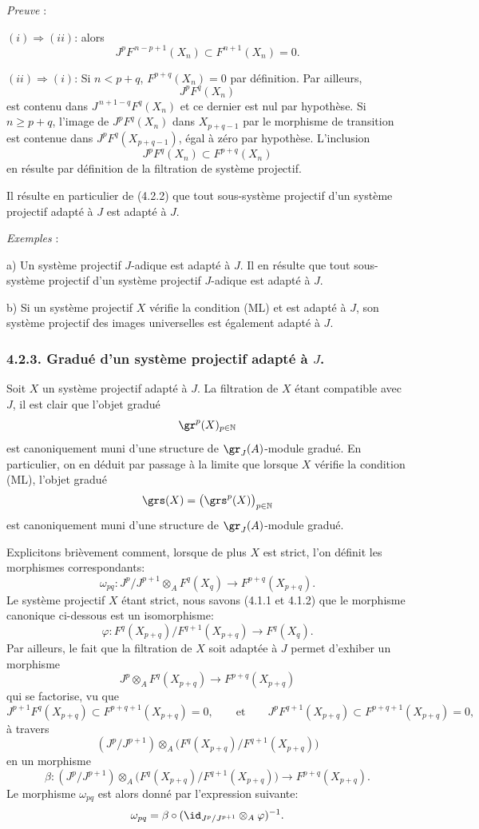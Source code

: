 \emph{Preuve} :

\((i)\Rightarrow(ii)\): alors
\[
J^pF^{\,n-p+1}(X_n)\subset F^{n+1}(X_n)=0.
\]

\((ii)\Rightarrow(i)\): Si \(n<p+q\), \(F^{p+q}(X_n)=0\) par définition. Par
ailleurs,
\[
J^pF^q(X_n)
\]
est contenu dans \(J^{\,n+1-q}F^q(X_n)\) et ce dernier est nul par hypothèse. Si \(n\ge p+q\), l'image de \(J^pF^q(X_n)\) dans \(X_{p+q-1}\) par le morphisme de transition est contenue dans \(J^pF^q(X_{p+q-1})\), égal à zéro par hypothèse. L'inclusion
\[
J^pF^q(X_n)\subset F^{p+q}(X_n)
\]
en résulte par définition de la filtration de système projectif.

Il résulte en particulier de (4.2.2) que tout sous-système projectif d'un système projectif adapté à \(J\) est adapté à \(J\).

\emph{Exemples} :

a) Un système projectif \(J\)-adique est adapté à \(J\). Il en résulte que tout sous-système projectif d'un système projectif \(J\)-adique est adapté à \(J\).

b) Si un système projectif \(X\) vérifie la condition (ML) et est adapté à \(J\), son système projectif des images universelles est également adapté à \(J\).

\subsubsection*{4.2.3. Gradué d'un système projectif adapté à \(J\).}
Soit \(X\) un système projectif adapté à \(J\). La filtration de \(X\) étant compatible avec \(J\), il est clair que l'objet gradué
\[
\gr^p(X)_{p\in\mathbb{N}}
\]
est canoniquement muni d'une structure de \(\gr_J(A)\)-module gradué. En particulier, on en déduit par passage à la limite que lorsque \(X\) vérifie la condition (ML), l'objet gradué
\[
\grs(X)=\bigl(\grs^p(X)\bigr)_{p\in\mathbb{N}}
\]
est canoniquement muni d'une structure de \(\gr_J(A)\)-module gradué.

Explicitons brièvement comment, lorsque de plus \(X\) est strict, l'on définit les morphismes correspondants:
\[
\omega_{pq}: J^p/J^{p+1}\otimes_A F^q(X_q)\longrightarrow F^{p+q}(X_{p+q}).
\]
Le
système projectif \(X\) étant strict, nous savons (4.1.1 et 4.1.2) que le morphisme canonique ci-dessous est un isomorphisme:
\[
\varphi:F^q(X_{p+q})/F^{q+1}(X_{p+q})\longrightarrow F^q(X_q).
\]
Par ailleurs, le fait que la filtration de \(X\) soit adaptée à \(J\) permet d'exhiber un morphisme
\[
J^p\otimes_A F^q(X_{p+q})\longrightarrow F^{p+q}(X_{p+q})
\]
qui se factorise, vu que
\[
J^{p+1}F^q(X_{p+q})\subset F^{p+q+1}(X_{p+q})=0,\qquad\text{et}\qquad
J^pF^{q+1}(X_{p+q})\subset F^{p+q+1}(X_{p+q})=0,
\]
à travers
\[
(J^p/J^{p+1})\otimes_A
\bigl(F^q(X_{p+q})/F^{q+1}(X_{p+q})\bigr)
\]
en un morphisme
\[
\beta:(J^p/J^{p+1})\otimes_A
\bigl(F^q(X_{p+q})/F^{q+1}(X_{p+q})\bigr)
\longrightarrow F^{p+q}(X_{p+q}).
\]
Le morphisme \(\omega_{pq}\) est alors donné par l'expression suivante:
\[
\omega_{pq}=\beta\circ(\id_{J^p/J^{p+1}}\otimes_A\varphi)^{-1}.
\]

